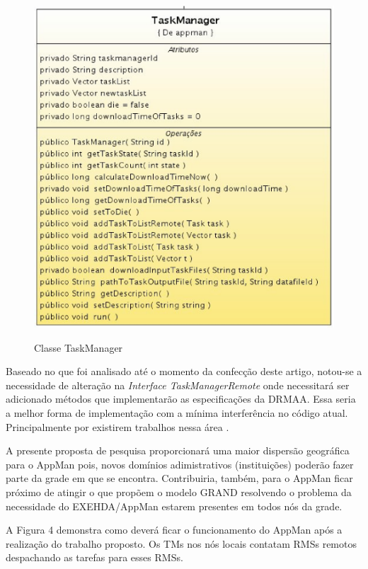 \begin{figure}[h]
\center
\includegraphics[scale=.3]{img/TaskManager.eps}
\label{TaskManager}
\caption{Classe TaskManager}
\end{figure}

Baseado no que foi analisado até o momento da confecção deste artigo, notou-se a necessidade de alteração na {\it Interface TaskManagerRemote} onde necessitará ser adicionado métodos que implementarão as especificações da DRMAA. Essa seria a melhor forma de implementação com a mínima interferência no código atual. Principalmente por existirem trabalhos nessa área \cite{Nobres2007}.

A presente proposta de pesquisa proporcionará uma maior dispersão geográfica para o AppMan pois, novos domínios adimistrativos (instituições) poderão fazer parte da grade em que se encontra. Contribuiria, também, para o AppMan ficar próximo de atingir o que propõem o modelo GRAND resolvendo o problema da necessidade do EXEHDA/AppMan estarem presentes em todos nós da grade. 

A Figura 4 demonstra como deverá ficar o funcionamento do AppMan após a realização do trabalho proposto. Os TMs nos nós locais contatam RMSs remotos despachando as tarefas para esses RMSs.

